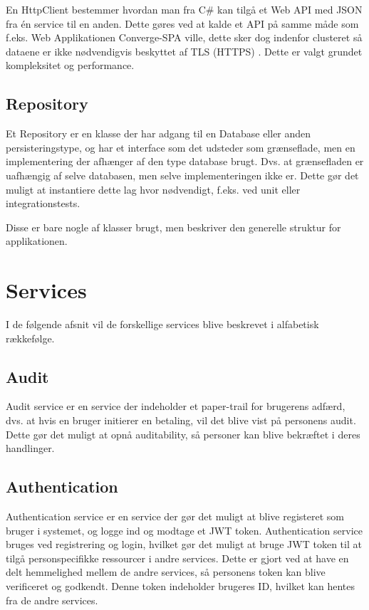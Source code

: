 En HttpClient bestemmer hvordan man fra C\# kan tilgå et Web API med JSON fra én service til en anden. Dette gøres ved at kalde et API på samme måde som f.eks. Web Applikationen Converge-SPA ville, dette sker dog indenfor clusteret så dataene er ikke nødvendigvis beskyttet af TLS (HTTPS) \cite[TLS]{converge-terms}. Dette er valgt grundet kompleksitet og performance.

\subsection{Repository}

Et Repository er en klasse der har adgang til en Database eller anden persisteringstype, og har et interface som det udsteder som grænseflade, men en implementering der afhænger af den type database brugt. Dvs. at grænsefladen er uafhængig af selve databasen, men selve implementeringen ikke er. Dette gør det muligt at instantiere dette lag hvor nødvendigt, f.eks. ved unit eller integrationstests.


Disse er bare nogle af klasser brugt, men beskriver den generelle struktur for applikationen.


\section{Services}

I de følgende afsnit vil de forskellige services blive beskrevet i alfabetisk rækkefølge.

\subsection{Audit}
\label{sec:audit-service}

Audit service er en service der indeholder et paper-trail for brugerens adfærd, dvs. at hvis en bruger initierer en betaling, vil det blive vist på personens audit. Dette gør det muligt at opnå auditability, så personer kan blive bekræftet i deres handlinger.

\subsection{Authentication}
\label{sec:authentication-service}

Authentication service er en service der gør det muligt at blive registeret som bruger i systemet, og logge ind og modtage et JWT token. Authentication service bruges ved registrering og login, hvilket gør det muligt at bruge JWT token til at tilgå personspecifikke ressourcer i andre services. Dette er gjort ved at have en delt hemmelighed mellem de andre services, så personens token kan blive verificeret og godkendt. Denne token indeholder brugeres ID, hvilket kan hentes fra de andre services.

